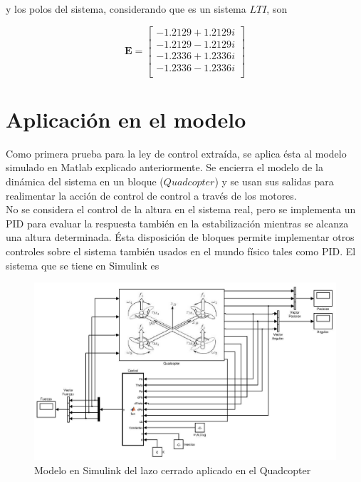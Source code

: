 \documentclass[twoside,11pt]{report}
\begin{document}
y los polos del sistema, considerando que es un sistema $LTI$, son

\begin{equation}
\mathbf{E}= \left[ \begin{array}{c}
  -1.2129 + 1.2129i \\
  -1.2129 - 1.2129i \\
  -1.2336 + 1.2336i \\
  -1.2336 - 1.2336i \\
\end{array} \right] 
\end{equation}

\section{Aplicación en el modelo}

Como primera prueba para la ley de control extraída, se aplica ésta al modelo simulado en Matlab explicado anteriormente. Se encierra el modelo de la dinámica del sistema en un bloque ($Quadcopter$) y se usan sus salidas para realimentar la acción de control de control a través de los motores. \\

No se considera el control de la altura en el sistema real, pero se implementa un PID para evaluar la respuesta también en la estabilización mientras se alcanza una altura determinada. Ésta disposición de bloques permite implementar otros controles sobre el sistema también usados en el mundo físico tales como PID. El sistema que se tiene en Simulink es

\newpage

\begin{center}
\begin{figure}[h!]
\includegraphics[scale=0.45]{images/Simulink_model_2.jpeg}
\caption{Modelo en Simulink del lazo cerrado aplicado en el Quadcopter}
\end{figure}
\end{center}
\end{document}
